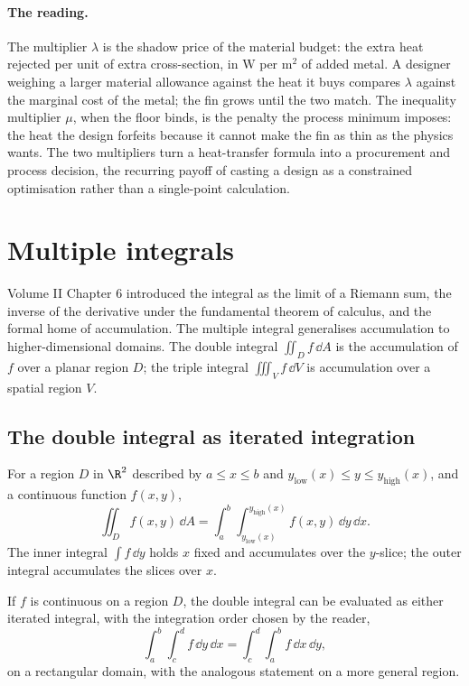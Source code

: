 \paragraph{The reading.} The multiplier $\lambda$ is the shadow price of
the material budget: the extra heat rejected per unit of extra
cross-section, in $\si{\watt}$ per $\si{\meter\squared}$ of added metal.
A designer weighing a larger material allowance against the heat it buys
compares $\lambda$ against the marginal cost of the metal; the fin grows
until the two match. The inequality multiplier $\mu$, when the floor
binds, is the penalty the process minimum imposes: the heat the design
forfeits because it cannot make the fin as thin as the physics wants.
The two multipliers turn a heat-transfer formula into a procurement and
process decision, the recurring payoff of casting a design as a
constrained optimisation rather than a single-point calculation.

\section{Multiple integrals}

Volume II Chapter 6 introduced the integral as the limit of a
Riemann sum, the inverse of the derivative under the fundamental
theorem of calculus, and the formal home of accumulation. The
multiple integral generalises accumulation to higher-dimensional
domains. The double integral $\iint_{D} f \,\dd A$ is the
accumulation of $f$ over a planar region $D$; the triple integral
$\iiint_{V} f \,\dd V$ is accumulation over a spatial region $V$.

\subsection{The double integral as iterated integration}

For a region $D$ in $\R^{2}$ described by $a \leq x \leq b$ and
$y_{\text{low}}(x) \leq y \leq y_{\text{high}}(x)$, and a continuous
function $f(x, y)$,
\[
\iint_{D} f(x, y) \,\dd A = \int_{a}^{b}
\!\int_{y_{\text{low}}(x)}^{y_{\text{high}}(x)} f(x, y) \,\dd y\,
\dd x.
\]
The inner integral $\int f \,\dd y$ holds $x$ fixed and accumulates
over the $y$-slice; the outer integral accumulates the slices over
$x$.

\begin{theorem}
If $f$ is continuous on a region $D$, the double integral can be
evaluated as either iterated integral, with the integration order
chosen by the reader,
\[
\int_{a}^{b}\!\int_{c}^{d} f \,\dd y\,\dd x =
\int_{c}^{d}\!\int_{a}^{b} f \,\dd x\,\dd y,
\]
on a rectangular domain, with the analogous statement on a more
general region.
\end{theorem}


